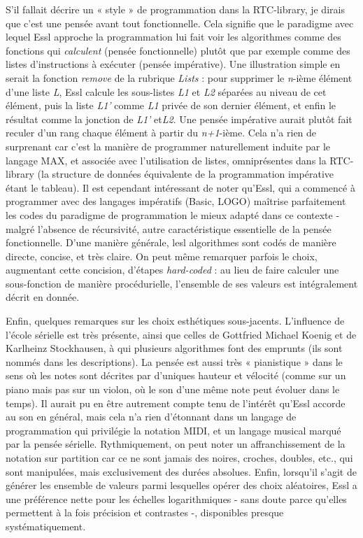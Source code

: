 \documentclass[a4paper,12pt]{article}
\begin{document}
S'il fallait décrire un « style » de programmation dans la RTC-library, je dirais que c'est une pensée avant tout fonctionnelle. Cela signifie que le paradigme avec lequel Essl approche la programmation lui fait voir les algorithmes comme des fonctions qui \emph{calculent} (pensée fonctionnelle) plutôt que par exemple comme des listes d'instructions à exécuter (pensée impérative). Une illustration simple en serait la fonction \emph{remove} de la rubrique \emph{Lists} : pour supprimer le \emph{n}-ième élément d'une liste \emph{L}, Essl calcule les sous-listes \emph{L1} et \emph{L2} séparées au niveau de cet élément, puis la liste \emph{L1'} comme \emph{L1} privée de son dernier élément, et enfin le résultat comme la jonction de \emph{L1'} et\emph{L2}. Une pensée impérative aurait plutôt fait reculer d'un rang chaque élément à partir du \emph{n+1}-ième. Cela n'a rien de surprenant car c'est la manière de programmer naturellement induite par le langage MAX, et associée avec l'utilisation de listes, omniprésentes dans la RTC-library (la structure de données équivalente de la programmation impérative étant le tableau). Il est cependant intéressant de noter qu'Essl, qui a commencé à programmer avec des langages impératifs (Basic, LOGO) maîtrise parfaitement les codes du paradigme de programmation le mieux adapté dans ce contexte - malgré l'absence de récursivité, autre caractéristique essentielle de la pensée fonctionnelle. D'une manière générale, lesl algorithmes sont codés de manière directe, concise, et très claire. On peut même remarquer parfois le choix, augmentant cette concision, d'étapes \emph{hard-coded} : au lieu de faire calculer une sous-fonction de manière procédurielle, l'ensemble de ses valeurs est intégralement décrit en donnée.

Enfin, quelques remarques sur les choix esthétiques sous-jacents. L'influence de l'école sérielle est très présente, ainsi que celles de Gottfried Michael Koenig et de Karlheinz Stockhausen, à qui plusieurs algorithmes font des emprunts (ils sont nommés dans les descriptions). La pensée est aussi très « pianistique » dans le sens où les notes sont décrites par d'uniques hauteur et vélocité (comme sur un piano mais pas sur un violon, où le son d'une même note peut évoluer dans le temps). Il aurait pu en être autrement compte tenu de l'intérêt qu'Essl accorde au son en général, mais cela n'a rien d'étonnant dans un langage de programmation qui privilégie la notation MIDI, et un langage musical marqué par la pensée sérielle. Rythmiquement, on peut noter un affranchissement de la notation sur partition car ce ne sont jamais des noires, croches, doubles, etc., qui sont manipulées, mais exclusivement des durées absolues. Enfin, lorsqu'il s'agit de générer les ensemble de valeurs parmi lesquelles opérer des choix aléatoires, Essl a une préférence nette pour les échelles logarithmiques - sans doute parce qu'elles permettent à la fois précision et contrastes -, disponibles presque systématiquement.
\end{document}
